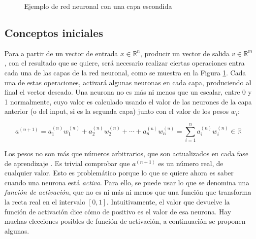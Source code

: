 \begin{figure}[H]
    \centering
    \caption{Ejemplo de red neuronal con una capa escondida}
    \label{redneuronal:1}
\end{figure}

\subsection{Conceptos iniciales}

Para a partir de un vector de entrada $x\in\mathbb{R}^n$, producir un vector de salida $v\in\mathbb{R}^m$,
con el resultado que se quiere, será necesario realizar ciertas operaciones entra cada una de las capas
de la red neuronal, como se muestra en la Figura \ref{redneuronal:1}. Cada una de estas operaciones, activará
algunas neuronas en cada capa, produciendo al final el vector deseado. Una neurona no es más ni menos
que un escalar, entre 0 y 1 normalmente, cuyo valor es calculado usando el valor de las neurones de la
capa anterior (o del input, si es la segunda capa) junto con el valor de los pesos $w_i$:

\[
    a^{(n+1)} = a^{(n)}_1w^{(n)}_1+a^{(n)}_2w^{(n)}_2+\cdots+a^{(n)}_nw^{(n)}_n=\sum_{i=1}^na^{(n)}_iw^{(n)}_i\in\mathbb{R}
\]

Los pesos no son más que números arbitrarios, que son actualizados en cada fase de aprendizaje \cite{rumelhart1986learning}.
Es trivial comprobar que $a^{(n+1)}$ es un número real, de cualquier valor. Esto es problemático porque
lo que se quiere ahora es saber cuando una neurona está \textit{activa}. Para ello, se puede usar lo
que se denomina una \textit{función de activación}, que no es ni más ni menos que una función  que transforma
la recta real en el intervalo $[0,1]$. Intuitivamente, el valor que devuelve la función de activación dice
cómo de positivo es el valor de esa neurona. Hay muchas elecciones posibles de función de activación, a continuación
se proponen algunas.

